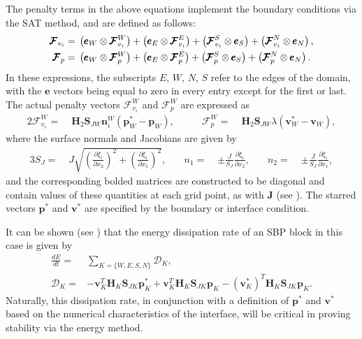 The penalty terms in the above equations implement the boundary conditions via the
SAT method, and are defined as follows:
\begin{align}
  \pmb{\mathcal{F}}_{v_{i}} =\;&
	\left(  \pmb{e}_{W} \otimes \pmb{\mathcal{F}}^{W}_{v_{i}} \right)
	+ \left(  \pmb{e}_{E} \otimes \pmb{\mathcal{F}}^{E}_{v_{i}} \right)
	+ \left( \pmb{\mathcal{F}}^{S}_{v_{i}} \otimes \pmb{e}_{S} \right)
	+ \left( \pmb{\mathcal{F}}^{N}_{v_{i}} \otimes \pmb{e}_{N} \right),\\
  \pmb{\mathcal{F}}_{p} =\;&
    \left( \pmb{e}_{W} \otimes \pmb{\mathcal{F}}^{W}_{p} \right)
	+ \left( \pmb{e}_{E} \otimes \pmb{\mathcal{F}}^{E}_{p} \right)
	+ \left( \pmb{\mathcal{F}}^{S}_{p} \otimes \pmb{e}_{S} \right)
	+ \left( \pmb{\mathcal{F}}^{N}_{p} \otimes \pmb{e}_{N} \right).
\end{align}
In these expressions, the subscripts $E$, $W$, $N$, $S$ refer to the edges
of the domain, with the $\pmb{e}$ vectors being equal to zero in every entry except
for the first or last. The actual penalty vectors $\pmb{\mathcal{F}}^{W}_{v_{i}}$ and
$\pmb{\mathcal{F}}^{W}_{p}$ are expressed as 
\begin{alignat}{2}
	\pmb{\mathcal{F}}^{W}_{v_{i}} =\;& \pmb{H}_{2} \pmb{S}_{JW} \pmb{n}^{W}_{i}
	\left( \pmb{p}^*_{W} - \pmb{p}_{W} \right),\qquad&
			  \pmb{\mathcal{F}}^{W}_{p} =\;& \pmb{H}_{2}\pmb{S}_{JW}
  \lambda
	\left( \pmb{v}^*_{W} - \pmb{v}_{W} \right),
\end{alignat}
where the surface normals and Jacobians are given by
\begin{alignat}{3}
	S_{J} =\;& J\sqrt{{\left(\frac{\partial \xi_{i}}{\partial x_{2}}\right)}^2 + {\left(\frac{\partial \xi_{i}}{\partial x_{1}}\right)}^2},\quad&
	n_{1} =\;& \pm\frac{J}{S_{J}} \frac{\partial \xi_{i}}{\partial x_{2}},\quad&
	n_{2} =\;& \pm\frac{J}{S_{J}} \frac{\partial \xi_{i}}{\partial x_{1}}, \label{eq:norms_jac}
\end{alignat}
and the corresponding bolded matrices are constructed to be diagonal and contain
values of these quantities at each grid point, as with $\pmb{J}$ (see ).
The starred vectors $\pmb{p}^{*}$ and $\pmb{v}^{*}$ are specified by the boundary
or interface condition.

It can be shown (see \cite{kozdon2016stable}) that the energy dissipation rate
of an SBP block in this case is given by
\begin{align}
  \frac{dE}{dt} = & \sum_{K = \{W,E,S,N\}} \mathcal{D}_{K},\\
  \mathcal{D}_{K} = &
  - \pmb{v}_{K}^{T}\pmb{H}_{K}\pmb{S}_{JK}\pmb{p}^{*}_{K}
  + \pmb{v}_{K}^{T}\pmb{H}_{K}\pmb{S}_{JK}\pmb{p}_{K}
	- {\left(\pmb{v}^{*}_{K}\right)}^{T}\pmb{H}_{K}\pmb{S}_{JK}\pmb{p}_{K}. \label{eq:sbp_diss}
\end{align}
Naturally, this dissipation rate, in conjunction with a definition of
$\pmb{p}^{*}$ and $\pmb{v}^{*}$ based on the numerical characteristics
of the interface, will be critical in proving stability via the energy
method.

